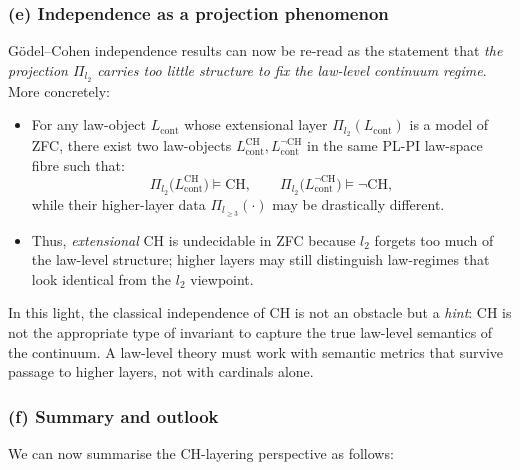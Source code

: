 \documentclass[11pt]{book}
\theoremstyle{plain}
\theoremstyle{definition}
\begin{document}
\subsubsection*{(e) Independence as a projection phenomenon}

Gödel--Cohen independence results can now be re-read as the statement
that \emph{the projection $\Pi_{l_2}$ carries too little structure to
fix the law-level continuum regime}. More concretely:

\begin{itemize}
  \item For any law-object $L_{\mathrm{cont}}$ whose extensional layer
        $\Pi_{l_2}(L_{\mathrm{cont}})$ is a model of ZFC, there exist
        two law-objects
        $L^{\mathrm{CH}}_{\mathrm{cont}},
         L^{\neg\mathrm{CH}}_{\mathrm{cont}}$
        in the same PL-PI law-space fibre such that:
        \[
          \Pi_{l_2}\bigl(L^{\mathrm{CH}}_{\mathrm{cont}}\bigr)
          \models \mathrm{CH},
          \qquad
          \Pi_{l_2}\bigl(L^{\neg\mathrm{CH}}_{\mathrm{cont}}\bigr)
          \models \neg\mathrm{CH},
        \]
        while their higher-layer data
        $\Pi_{l_{\ge3}}(\cdot)$ may be drastically different.
  \item Thus, \emph{extensional} CH is undecidable in ZFC because
        $l_2$ forgets too much of the law-level structure; higher
        layers may still distinguish law-regimes that look identical
        from the $l_2$ viewpoint.
\end{itemize}

In this light, the classical independence of CH is not an obstacle but
a \emph{hint}: CH is not the appropriate type of invariant to capture
the true law-level semantics of the continuum. A law-level theory must
work with semantic metrics that survive passage to higher layers, not
with cardinals alone.



\subsubsection*{(f) Summary and outlook}

We can now summarise the CH-layering perspective as follows:
\end{document}
